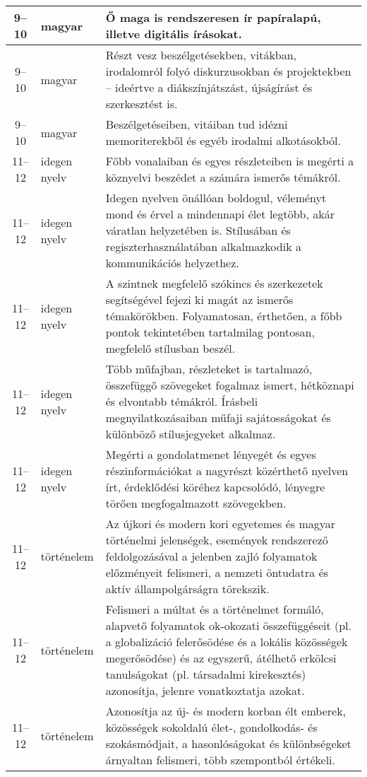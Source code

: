\begin{small}
\begin{longtable}{c | p{2cm} |  p{11cm} }
              9--10 & magyar & Ő maga is rendszeresen ír papíralapú, illetve digitális írásokat. \\ \hline
              9--10 & magyar & Részt vesz beszélgetésekben, vitákban, irodalomról folyó diskurzusokban és projektekben – ideértve a diákszínjátszást, újságírást és szerkesztést is. \\ \hline
              9--10 & magyar & Beszélgetéseiben, vitáiban tud idézni memoriterekből és egyéb irodalmi alkotásokból. \\ \hline
              11--12 & idegen nyelv & Főbb vonalaiban és egyes részleteiben is megérti a köznyelvi beszédet a számára ismerős témákról. \\ \hline
              11--12 & idegen nyelv & Idegen nyelven önállóan boldogul, véleményt mond és érvel a mindennapi élet legtöbb, akár váratlan helyzetében is. Stílusában és regiszterhasználatában alkalmazkodik a kommunikációs helyzethez. \\ \hline
              11--12 & idegen nyelv & A szintnek megfelelő szókincs és szerkezetek segítségével fejezi ki magát az ismerős témakörökben. Folyamatosan, érthetően, a főbb pontok tekintetében tartalmilag pontosan, megfelelő stílusban beszél. \\ \hline
              11--12 & idegen nyelv & Több műfajban, részleteket is tartalmazó, összefüggő szövegeket fogalmaz ismert, hétköznapi és elvontabb témákról. Írásbeli megnyilatkozásaiban műfaji sajátosságokat és különböző stílusjegyeket alkalmaz. \\ \hline
              11--12 & idegen nyelv & Megérti a gondolatmenet lényegét és egyes részinformációkat a nagyrészt közérthető nyelven írt, érdeklődési köréhez kapcsolódó, lényegre törően megfogalmazott szövegekben. \\ \hline
              11--12 & történelem & Az újkori és modern kori egyetemes és magyar történelmi jelenségek, események rendszerező feldolgozásával a jelenben zajló folyamatok előzményeit felismeri, a nemzeti öntudatra és aktív állampolgárságra törekszik. \\ \hline
              11--12 & történelem & Felismeri a múltat és a történelmet formáló, alapvető folyamatok ok-okozati összefüggéseit (pl. a globalizáció felerősödése és a lokális közösségek megerősödése) és az egyszerű, átélhető erkölcsi tanulságokat (pl. társadalmi kirekesztés) azonosítja, jelenre vonatkoztatja azokat. \\ \hline
              11--12 & történelem & Azonosítja az új- és modern korban élt emberek, közösségek sokoldalú élet-, gondolkodás- és szokásmódjait, a hasonlóságokat és különbségeket árnyaltan felismeri, több szempontból értékeli. \\ \hline

\end{longtable}
\end{small}
